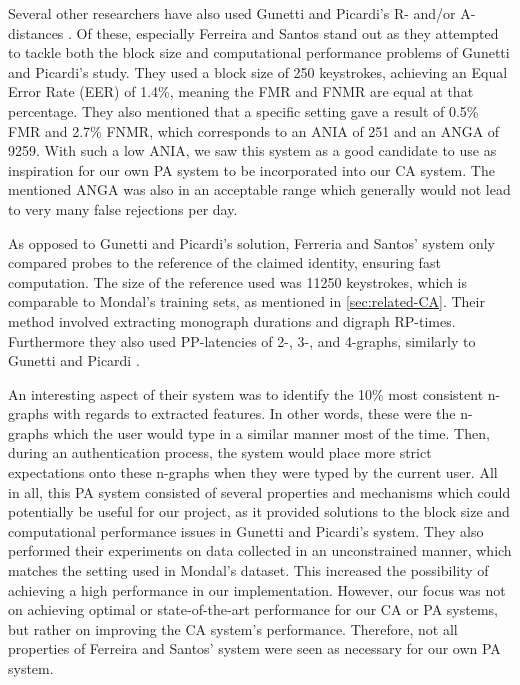 Several other researchers have also used Gunetti and Picardi's R- and/or A-distances \cite{davoudi2009, davoudi2010, superResults, hu, sliding, Kolakowska2011, Messerman, Pinto2014, meaningless, KANG201572}.
Of these, especially Ferreira and Santos \cite{superResults} stand out as they attempted to tackle both the block size and computational performance problems of Gunetti and Picardi's \cite{gnp} study.
They used a block size of 250 keystrokes, achieving an Equal Error Rate (EER) of 1.4\%, meaning the FMR and FNMR are equal at that percentage.
They also mentioned that a specific setting gave a result of 0.5\% FMR and 2.7\% FNMR, which corresponds to an ANIA of 251 and an ANGA of 9259.
With such a low ANIA, we saw this system as a good candidate to use as inspiration for our own PA system to be incorporated into our CA system.
The mentioned ANGA was also in an acceptable range which generally would not lead to very many false rejections per day.

As opposed to Gunetti and Picardi's solution, Ferreria and Santos' system \cite{superResults} only compared probes to the reference of the claimed identity, ensuring fast computation.
The size of the reference used was 11250 keystrokes, which is comparable to Mondal's \cite{mondal} training sets, as mentioned in \cref{sec:related-CA}.
Their method involved extracting monograph durations and digraph RP-times.
Furthermore they also used PP-latencies of 2-, 3-, and 4-graphs, similarly to Gunetti and Picardi \cite{gnp}.

An interesting aspect of their system was to identify the 10\% most consistent n-graphs with regards to extracted features.
In other words, these were the n-graphs which the user would type in a similar manner most of the time.
Then, during an authentication process, the system would place more strict expectations onto these n-graphs when they were typed by the current user.
All in all, this PA system consisted of several properties and mechanisms which could potentially be useful for our project, as it provided solutions to the block size and computational performance issues in Gunetti and Picardi's \cite{gnp} system.
They also performed their experiments on data collected in an unconstrained manner, which matches the setting used in Mondal's \cite{mondal} dataset. 
This increased the possibility of achieving a high performance in our implementation.
However, our focus was not on achieving optimal or state-of-the-art performance for our CA or PA systems, but rather on improving the CA system's performance.
Therefore, not all properties of Ferreira and Santos' \cite{superResults} system were seen as necessary for our own PA system.

